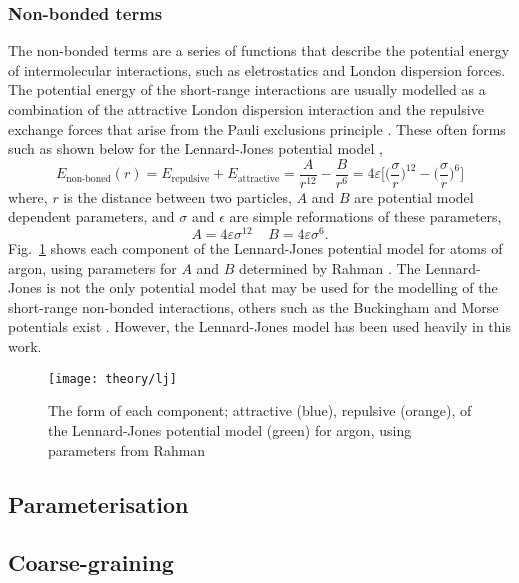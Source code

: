 \subsubsection{Non-bonded terms}
The non-bonded terms are a series of functions that describe the potential energy of intermolecular interactions, such as eletrostatics and London dispersion forces.
The potential energy of the short-range interactions are usually modelled as a combination of the attractive London dispersion interaction and the repulsive exchange forces that arise from the Pauli exclusions principle \cite{Leach1996}.
These often forms such as shown below for the Lennard-Jones potential model \cite{LennardJones1924},
%
\begin{equation}
  E_{\text{non-boned}}(r) = E_{\text{repulsive}} + E_{\text{attractive}} = \frac{A}{r^{12}} - \frac{B}{r^6} = 4\varepsilon\Bigg[\bigg(\frac{\sigma}{r}\bigg)^{12} - \bigg(\frac{\sigma}{r}\bigg)^6\Bigg]
\end{equation}
%
where, $r$ is the distance between two particles, $A$ and $B$ are potential model dependent parameters, and $\sigma$ and $\epsilon$ are simple reformations of these parameters,
%
\begin{equation}
  A = 4\varepsilon\sigma^{12} \;\;\;\; B = 4\varepsilon\sigma^6.
\end{equation}
%
Fig.~\ref{fig:lj} shows each component of the Lennard-Jones potential model for atoms of argon, using parameters for $A$ and $B$ determined by Rahman \cite{Rahman1964}.
The Lennard-Jones is not the only potential model that may be used for the modelling of the short-range non-bonded interactions, others such as the Buckingham and Morse potentials exist \cite{Buckingham1938, Morse1929}.
However, the Lennard-Jones model has been used heavily in this work.
%
\begin{figure}
	\centering
	\texttt{[image: theory/lj]}
	\caption{The form of each component; attractive (blue), repulsive (orange), of the Lennard-Jones potential model (green) for argon, using parameters from Rahman \cite{Rahman1964}}
	\label{fig:lj}
\end{figure}
%






\subsection{Parameterisation}
\label{sec:parameterisation}
\subsection{Coarse-graining}
